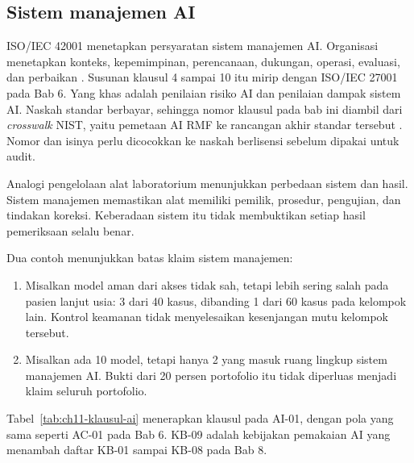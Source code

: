 \subsection*{Sistem manajemen AI}

ISO/IEC 42001 menetapkan persyaratan sistem manajemen AI. Organisasi menetapkan konteks,
kepemimpinan, perencanaan, dukungan, operasi, evaluasi, dan perbaikan \cite{iso42001-2023}. Susunan
klausul 4 sampai 10 itu mirip dengan ISO/IEC 27001 pada Bab 6. Yang khas adalah penilaian risiko AI
dan penilaian dampak sistem AI. Naskah standar berbayar, sehingga nomor klausul pada bab ini diambil
dari \textit{crosswalk} NIST, yaitu pemetaan AI RMF ke rancangan akhir standar tersebut
\cite{c11-nist-crosswalk}. Nomor dan isinya perlu dicocokkan ke naskah berlisensi sebelum dipakai
untuk audit.

Analogi pengelolaan alat laboratorium menunjukkan perbedaan sistem dan hasil. Sistem manajemen
memastikan alat memiliki pemilik, prosedur, pengujian, dan tindakan koreksi. Keberadaan sistem itu
tidak membuktikan setiap hasil pemeriksaan selalu benar.

Dua contoh menunjukkan batas klaim sistem manajemen:
\begin{enumerate}
  \item Misalkan model aman dari akses tidak sah, tetapi lebih sering salah pada pasien lanjut
  usia: 3 dari 40 kasus, dibanding 1 dari 60 kasus pada kelompok lain. Kontrol keamanan tidak
  menyelesaikan kesenjangan mutu kelompok tersebut.
  \item Misalkan ada 10 model, tetapi hanya 2 yang masuk ruang lingkup sistem manajemen AI. Bukti
  dari 20 persen portofolio itu tidak diperluas menjadi klaim seluruh portofolio.
\end{enumerate}

Tabel~\ref{tab:ch11-klausul-ai} menerapkan klausul pada AI-01, dengan pola yang sama seperti AC-01
pada Bab 6. KB-09 adalah kebijakan pemakaian AI yang menambah daftar KB-01 sampai KB-08 pada Bab 8.

